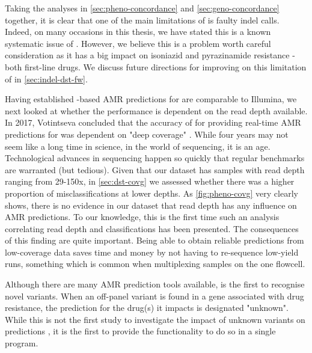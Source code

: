 Taking the analyses in \autoref{sec:pheno-concordance} and \autoref{sec:geno-concordance} together, it is clear that one of the main limitations of \drprg{} is faulty indel calls. Indeed, on many occasions in this thesis, we have stated this is a known systematic issue of \ont{} \cite{watson2019}. However, we believe this is a problem worth careful consideration as it has a big impact on isoniazid and pyrazinamide resistance - both first-line \mtb{} drugs. We discuss future directions for improving on this limitation of \drprg{} in \autoref{sec:indel-dst-fw}.

\noindent
Having established \ont{}-based AMR predictions for \mtb{} are comparable to Illumina, we next looked at whether the \ont{} performance is dependent on the read depth available. In 2017, Votintseva \etal{} concluded that the accuracy of \ont{} for providing real-time AMR predictions for \mtb{} was dependent on "deep coverage" \cite{Votintseva2017}. While four years may not seem like a long time in science, in the world of \ont{} sequencing, it is an age. Technological advances in \ont{} sequencing happen so quickly that regular benchmarks are warranted (but tedious). Given that our dataset has samples with read depth ranging from 29-150x, in \autoref{sec:dst-covg} we assessed whether there was a higher proportion of misclassifications at lower depths. As \autoref{fig:pheno-covg} very clearly shows, there is no evidence in our dataset that read depth has any influence on AMR predictions. To our knowledge, this is the first time such an analysis correlating read depth and classifications has been presented. The consequences of this finding are quite important. Being able to obtain reliable predictions from low-coverage data saves time and money by not having to re-sequence low-yield \ont{} runs, something which is common when multiplexing samples on the one flowcell.

\noindent
Although there are many \mtb{} AMR prediction tools available, \drprg{} is the first to recognise novel variants. When an off-panel variant is found in a gene associated with drug resistance, the prediction for the drug(s) it impacts is designated "unknown". While this is not the first study to investigate the impact of unknown variants on predictions \cite{cryptic2018,hunt2019}, it is the first to provide the functionality to do so in a single program.


